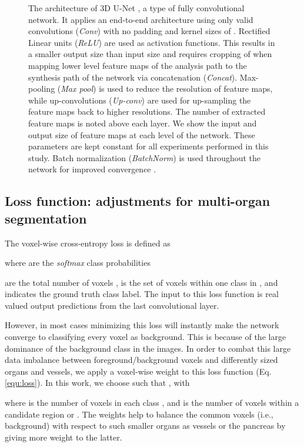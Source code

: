 \documentclass[authoryear]{elsarticle}
\begin{document}
\begin{figure*}[htb]
	\centering
	\caption{\textcolor{revision}{The architecture of 3D U-Net \citep{cciccek20163d}, a type of fully convolutional network. It applies an end-to-end architecture using only valid convolutions (\textit{Conv}) with no padding and kernel sizes of . Rectified Linear units (\textit{ReLU}) are used as activation functions. This results in a smaller output size than input size and requires cropping of when mapping lower level feature maps of the analysis path to the synthesis path of the network via concatenation (\textit{Concat}). Max-pooling (\textit{Max pool}) is used to reduce the resolution of feature maps, while up-convolutions (\textit{Up-conv}) are used for up-sampling the feature maps back to higher resolutions. The number of extracted feature maps is noted above each layer. We show the input and output size of feature maps at each level of the network. These parameters are kept constant for all experiments performed in this study. Batch normalization (\textit{BatchNorm}) is used throughout the network for improved convergence \citep{ioffe2015batch}.} \label{fig:3Dunet}}
\end{figure*}
\subsection{Loss function: adjustments for multi-organ segmentation}
\textcolor{revision}{The voxel-wise cross-entropy loss is defined as} 

\textcolor{revision}{where  are the \textit{softmax} class probabilities}
 		
\textcolor{revision}{ are the total number of voxels ,  is the set of voxels within one class in , and  indicates the ground truth class label. The input to this loss function is real valued output predictions  from the last convolutional layer.} 

\textcolor{revision}{However, in most cases minimizing this loss will instantly make the network converge to classifying every voxel as background. This is because of the large dominance of the background class in the images. In order to combat this large data imbalance between foreground/background voxels and differently sized organs and vessels, we apply a voxel-wise weight  to this loss function (Eq. \ref{equ:loss}). In this work, we choose  such that , with}

\textcolor{revision}{where  is the number of voxels in each class , and  is the number of voxels within a candidate region  or . The weights  help to balance the common voxels (i.e., background) with respect to such smaller organs as vessels or the pancreas by giving more weight to the latter.}
\end{document}
